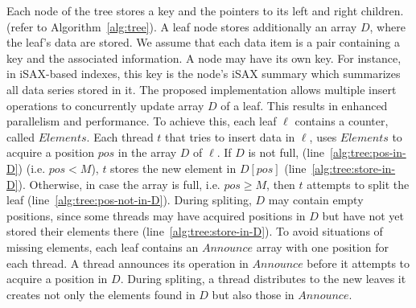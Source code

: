     Each node of the tree stores a key and the pointers
    to its left and right children.  (refer to Algorithm~\ref{alg:tree}).
    A leaf node stores additionally an array $D$, where the leaf's data are stored. 
    We assume that each data item is a pair containing a key and the associated information.
    A node may have its own key. For instance, in iSAX-based indexes, this key is the node's
    iSAX summary which summarizes all data series stored in it.
    The proposed implementation allows multiple insert operations to concurrently update array
    $D$ of a leaf. This results in enhanced parallelism and performance. 
    To achieve this, each leaf $\ell$ contains a counter, called $\mathit{Elements}$.
    Each thread $\mathit{t}$ that tries to insert data in $\ell$, uses
    $\mathit{Elements}$ to acquire a position $\mathit{pos}$ in the array $D$ of $\ell$.
    If $D$ is not full, (line~\ref{alg:tree:pos-in-D}) (i.e. $\mathit{pos} < M$), 
    $\mathit{t}$ stores the new element in $D[\mathit{pos}]$ (line~\ref{alg:tree:store-in-D}).
    Otherwise, in case the array is full, i.e. $\mathit{pos \geq M}$, then 
    $\mathit{t}$ attempts to split the leaf (line~\ref{alg:tree:pos-not-in-D}). 
    During spliting, $D$ may contain empty positions, since some
    threads may have acquired positions in $D$ but have not yet stored their
    elements there (line~\ref{alg:tree:store-in-D}).
    To avoid situations of missing elements, each leaf contains an $\mathit{Announce}$ array 
    with one position for each thread. A thread announces its operation
    in $\mathit{Announce}$ before it attempts to acquire a position in $D$.
    During spliting, a thread distributes to the new leaves it creates not only the
    elements found in $D$ but also those in $\mathit{Announce}$.


